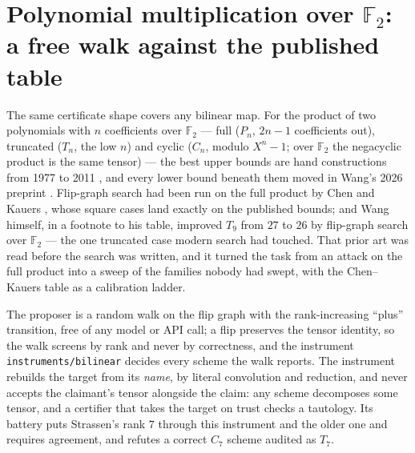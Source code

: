 \documentclass[11pt]{article}
\newcommand{\F}{\mathbb{F}}
\begin{document}
\section{Polynomial multiplication over $\F_2$: a free walk against the published table}\label{sec:bl}

The same certificate shape covers any bilinear map. For the product of two polynomials with $n$
coefficients over $\F_2$ --- full ($P_n$, $2n-1$ coefficients out), truncated ($T_n$, the low $n$) and cyclic
($C_n$, modulo $X^n-1$; over $\F_2$ the negacyclic product is the same tensor) --- the best upper bounds are
hand constructions from 1977 to 2011 \cite{Wi77,WM83,Mo90,Mo05,FH07,CO11}, and every lower bound beneath
them moved in Wang's 2026 preprint \cite{Wa26}. Flip-graph search had been run on the full product by Chen
and Kauers \cite{CK25}, whose square cases land exactly on the published bounds; and Wang himself, in a
footnote to his table, improved $T_9$ from $27$ to $26$ by flip-graph search over $\F_2$ --- the one
truncated case modern search had touched. That prior art was read before the search was written, and it
turned the task from an attack on the full product into a sweep of the families nobody had swept, with the
Chen--Kauers table as a calibration ladder.

The proposer is a random walk on the flip graph with the rank-increasing ``plus'' transition, free of any
model or API call; a flip preserves the tensor identity, so the walk screens by rank and never by
correctness, and the instrument \texttt{instruments/bilinear} decides every scheme the walk reports. The
instrument rebuilds the target from its \emph{name}, by literal convolution and reduction, and never
accepts the claimant's tensor alongside the claim: any scheme decomposes some tensor, and a certifier that
takes the target on trust checks a tautology. Its battery puts Strassen's rank $7$ through this instrument
and the older one and requires agreement, and refutes a correct $C_7$ scheme audited as $T_7$.

\begin{table}[h]\centering\small
{}
\caption{Every target certified, against the literature as transcribed in the bounds corpus (retrieved \BLRetrieved). ``CK'' is the Chen--Kauers full-product rank. Each walk ran \BLSeeds\ seeds for
\BLSteps\ steps at zero cost.}\label{tab:bl}
\end{table}
\end{document}
